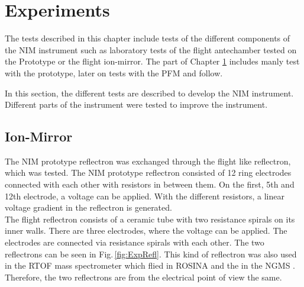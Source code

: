 \section{Experiments} \label{sec:Exp}
	The tests described in this chapter include tests of the different components of the NIM instrument such as laboratory tests of the flight antechamber tested on the Prototype or the flight ion-mirror. The part of Chapter \ref{sec:Exp} includes manly test with the prototype, later on tests with the PFM and follow.


%


	In this section, the different tests are described to develop the NIM instrument. Different parts of the instrument were tested to improve the instrument.
	\subsection{Ion-Mirror}
	The NIM prototype reflectron was exchanged through the flight like reflectron, which was tested. The NIM prototype reflectron consisted of 12 ring electrodes connected with each other with resistors in between them. On the first, 5th and 12th electrode, a voltage can be applied. With the different resistors, a linear voltage gradient in the reflectron is generated.\\ %
	The flight reflectron consists of a ceramic tube with two resistance spirals on its inner walls. There are three electrodes, where the voltage can be applied. The electrodes are connected via resistance spirals with each other. The two reflectrons can be seen in Fig.\,\ref{fig:ExpRefl}. This kind of reflectron was also used in the RTOF mass spectrometer which flied in ROSINA \cite{Diss_Scherer} and the in the NGMS \cite{Diss_Hofer}. \\ %
	Therefore, the two reflectrons are from the electrical point of view the same.\\ %
	

